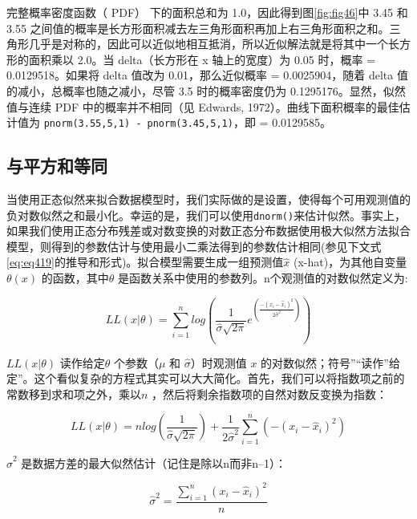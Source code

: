 \documentclass[
  lang=cn,
  11pt,
  scheme=chinese,
  chinesefont=nofont,
  citestyle=gb7714-2015,
  bibstyle=gb7714-2015]{elegantbook}
\begin{document}
完整概率密度函数（ PDF） 下的面积总和为 1.0，因此得到图\ref{fig:fig46}中 3.45 和 3.55 之间值的概率是长方形面积减去左三角形面积再加上右三角形面积之和。三角形几乎是对称的，因此可以近似地相互抵消，所以近似解法就是将其中一个长方形的面积乘以 2.0。当 delta（长方形在 x 轴上的宽度）为 0.05 时，概率 = 0.0129518。如果将 delta 值改为 0.01，那么近似概率 = 0.0025904，随着 delta 值的减小，总概率也随之减小，尽管 3.5 时的概率密度仍为 0.1295176。显然，似然值与连续 PDF 中的概率并不相同（见 Edwards, 1972）。曲线下面积概率的最佳估计值为 \texttt{pnorm(3.55,5,1)\ -\ pnorm(3.45,5,1)}，即 = 0.0129585。

\subsection{与平方和等同}\label{ux4e0eux5e73ux65b9ux548cux7b49ux540c}

当使用正态似然来拟合数据模型时，我们实际做的是设置，使得每个可用观测值的负对数似然之和最小化。幸运的是，我们可以使用\texttt{dnorm()}来估计似然。事实上，如果我们使用正态分布残差或对数变换的对数正态分布数据使用极大似然方法拟合模型，则得到的参数估计与使用最小二乘法得到的参数估计相同(参见下文式\eqref{eq:eq419}的推导和形式)。拟合模型需要生成一组预测值\(\hat x\) (x-hat)，为其他自变量\(\theta(x)\) 的函数，其中\(\theta\) 是函数关系中使用的参数列。n个观测值的对数似然定义为:

\begin{equation}  
LL(x|\theta)=\sum\limits_{i=1}^{n}{log\left( \frac{1}{\hat{\sigma }\sqrt{2\pi }}{{e}^{\left( \frac{-{{\left( {x_i}-{{\hat{x}}_{i}} \right)}^{2}}}{2{{{\hat{\sigma }}}^{2}}} \right)}} \right)}  
\label{eq:eq413}  
\end{equation}

\(LL(x|\theta)\) 读作给定\(\theta\) 个参数（\(\mu\) 和 \(\hat \sigma\)）时观测值 \(x\) 的对数似然；符号''\textbar{}``读作''给定''。这个看似复杂的方程式其实可以大大简化。首先，我们可以将指数项之前的常数移到求和项之外，乘以\(n\) ，然后将剩余指数项的自然对数反变换为指数：

\begin{equation}  
LL(x|\theta)=n log\left( \frac{1}{\hat{\sigma }\sqrt{2\pi }} \right)+\frac{1}{2{\hat{\sigma }^{2}}}\sum\limits_{i=1}^{n}{\left( -{{\left( x_i-\hat{x}_i \right)}^{2}} \right)}  
\label{eq:eq414}  
\end{equation}

\(\hat \sigma^2\) 是数据方差的最大似然估计（记住是除以n而非n--1）：

\begin{equation}  
{{\hat{\sigma }}^{2}}=\frac{\sum\limits_{i=1}^{n}{{{\left( x_i-\hat{x}_i \right)}^{2}}}}{n}  
\label{eq:eq415}  
\end{equation}
\end{document}
